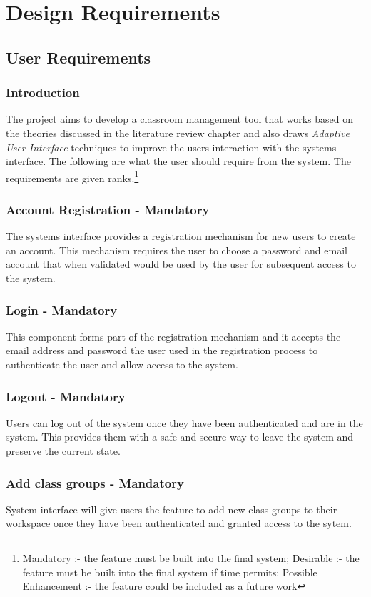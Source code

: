 \section{Design Requirements}
\subsection{User Requirements}
\subsubsection{Introduction}
The project aims to develop a classroom management tool that works based on the theories discussed in the literature review chapter and also draws \emph{Adaptive User Interface} techniques to improve the users interaction with the systems interface. The following are what the user should require from the system. The requirements are given ranks.\footnote{ Mandatory :- the feature must be built into the final system; Desirable :- the feature must be built into the final system if time permits; Possible Enhancement :- the feature could be included as a future work}

\subsubsection{Account Registration - Mandatory}
The systems interface provides a registration mechanism for new users to create an account. This mechanism requires the user to choose a password and email account that when validated would be used by the user for subsequent access to the system.

\subsubsection{Login - Mandatory}
This component forms part of the registration mechanism and it accepts the email address and password the user used in the registration process to authenticate the user and allow access to the system. 

\subsubsection{Logout - Mandatory}
Users can log out of the system once they have been authenticated and are in the system. This provides them with a safe and secure way to leave the system and preserve the current state.

\subsubsection{Add class groups - Mandatory}
System interface will give users the feature to add new class groups to their workspace once they have been authenticated and granted access to the sytem. 

